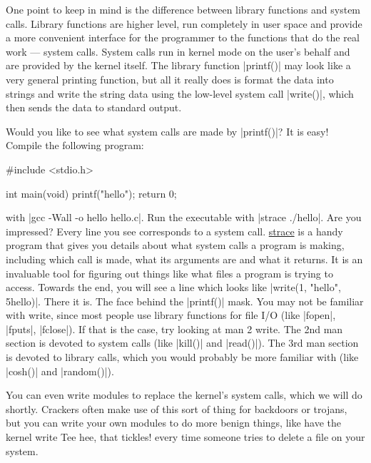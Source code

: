 \documentclass[10pt, oneside]{book}
\begin{document}
One point to keep in mind is the difference between library functions and system calls. Library functions are higher level, run completely in user space and provide a more convenient interface for the programmer to the functions that do the real work --- system calls.
System calls run in kernel mode on the user's behalf and are provided by the kernel itself.
The library function \cpp|printf()| may look like a very general printing function, but all it really does is format the data into strings and write the string data using the low-level system call \cpp|write()|, which then sends the data to standard output.

Would you like to see what system calls are made by \cpp|printf()|?
It is easy!
Compile the following program:

\begin{code}
#include <stdio.h>

int main(void)
{
    printf("hello");
    return 0;
}
\end{code}

with \sh|gcc -Wall -o hello hello.c|.
Run the executable with \sh|strace ./hello|.
Are you impressed?
Every line you see corresponds to a system call.
\href{https://strace.io/}{strace} is a handy program that gives you details about what system calls a program is making, including which call is made, what its arguments are and what it returns.
It is an invaluable tool for figuring out things like what files a program is trying to access.
Towards the end, you will see a line which looks like \cpp|write(1, "hello", 5hello)|.
There it is.
The face behind the \cpp|printf()| mask.
You may not be familiar with write, since most people use library functions for file I/O (like \cpp|fopen|, \cpp|fputs|, \cpp|fclose|).
If that is the case, try looking at man 2 write.
The 2nd man section is devoted to system calls (like \cpp|kill()| and \cpp|read()|).
The 3rd man section is devoted to library calls, which you would probably be more familiar with (like \cpp|cosh()| and \cpp|random()|).

You can even write modules to replace the kernel's system calls, which we will do shortly.
Crackers often make use of this sort of thing for backdoors or trojans, but you can write your own modules to do more benign things, like have the kernel write Tee hee, that tickles! every time someone tries to delete a file on your system.
\end{document}
